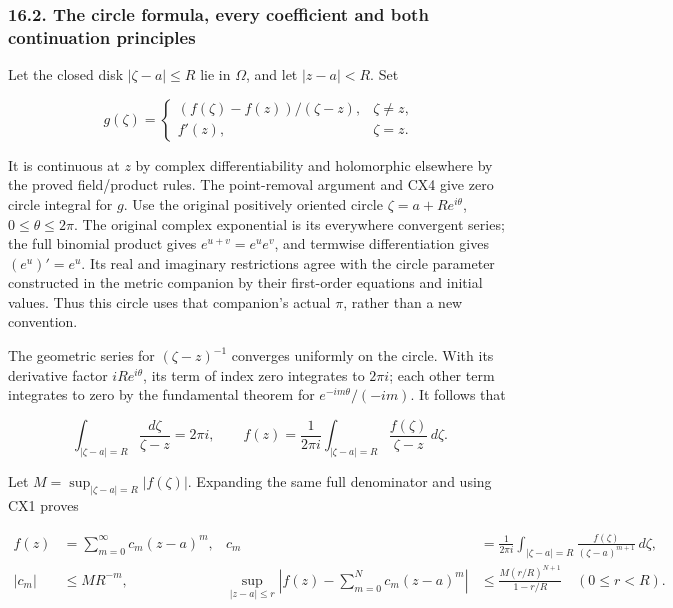 \documentclass[
  11pt,
]{article}
\begin{document}
\subsubsection{16.2. The circle formula, every coefficient and both
continuation
principles}\label{the-circle-formula-every-coefficient-and-both-continuation-principles}

Let the closed disk \(|\zeta-a|\leq R\) lie in \(\Omega\), and let
\(|z-a|<R\). Set

\[
g(\zeta)=
 \begin{cases}
 (f(\zeta)-f(z))/(\zeta-z),&\zeta\ne z,\\
 f'(z),&\zeta=z.
 \end{cases}
\tag{CX5}
\]

It is continuous at \(z\) by complex differentiability and holomorphic
elsewhere by the proved field/product rules. The point-removal argument
and CX4 give zero circle integral for \(g\). Use the original positively
oriented circle \(\zeta=a+Re^{i\theta}\), \(0\leq\theta\leq2\pi\). The
original complex exponential is its everywhere convergent series; the
full binomial product gives \(e^{u+v}=e^ue^v\), and termwise
differentiation gives \((e^u)'=e^u\). Its real and imaginary
restrictions agree with the circle parameter constructed in the metric
companion by their first-order equations and initial values. Thus this
circle uses that companion's actual \(\pi\), rather than a new
convention.

The geometric series for \((\zeta-z)^{-1}\) converges uniformly on the
circle. With its derivative factor \(iRe^{i\theta}\), its term of index
zero integrates to \(2\pi i\); each other term integrates to zero by the
fundamental theorem for \(e^{-im\theta}/(-im)\). It follows that

\[
\int_{|\zeta-a|=R}\frac{d\zeta}{\zeta-z}=2\pi i,\qquad
f(z)=\frac1{2\pi i}\int_{|\zeta-a|=R}
                          \frac{f(\zeta)}{\zeta-z}\,d\zeta .
\tag{CX6}
\]

Let \(M=\sup_{|\zeta-a|=R}|f(\zeta)|\). Expanding the same full
denominator and using CX1 proves

\[
\begin{aligned}
f(z)&=\sum_{m=0}^\infty c_m(z-a)^m,&
c_m&=\frac1{2\pi i}\int_{|\zeta-a|=R}
                     \frac{f(\zeta)}{(\zeta-a)^{m+1}}\,d\zeta,\\
|c_m|&\leq MR^{-m},&
\sup_{|z-a|\leq r}\left|f(z)-\sum_{m=0}^Nc_m(z-a)^m\right|
 &\leq \frac{M(r/R)^{N+1}}{1-r/R}\quad(0\leq r<R).
\end{aligned}
\tag{CX7}
\]
\end{document}
